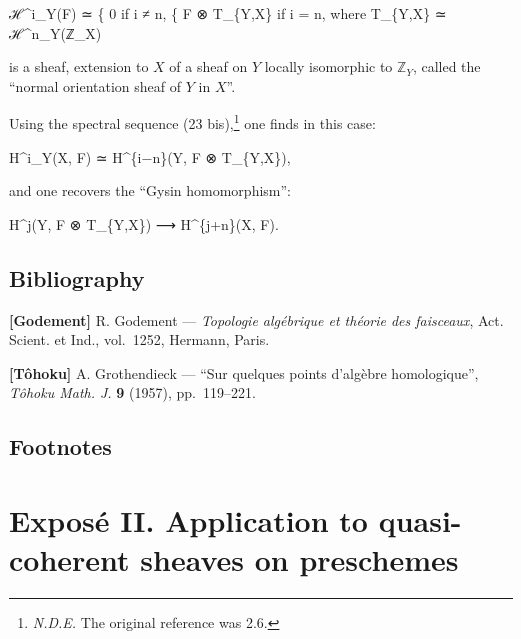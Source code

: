 \documentclass[
  11pt,
  a4paper,
]{book}
\newenvironment{Shaded}{}{}
\newcommand{\NormalTok}[1]{#1}
\begin{document}
\begin{Shaded}
\begin{Highlighting}[]
\NormalTok{ℋ\^{}i\_Y(F) ≃ \{ 0            if i ≠ n,}
\NormalTok{           \{ F ⊗ T\_\{Y,X\}   if i = n,    where  T\_\{Y,X\} ≃ ℋ\^{}n\_Y(ℤ\_X)}
\end{Highlighting}
\end{Shaded}

is a sheaf, extension to \(X\) of a sheaf on \(Y\) locally isomorphic to
\(\mathbb{Z}_{Y}\), called the ``normal orientation sheaf of \(Y\) in
\(X\)''.

Using the spectral sequence (23 bis),\footnote{\emph{N.D.E.} The
  original reference was 2.6.} one finds in this case:

\begin{Shaded}
\begin{Highlighting}[]
\NormalTok{H\^{}i\_Y(X, F) ≃ H\^{}\{i−n\}(Y, F ⊗ T\_\{Y,X\}),}
\end{Highlighting}
\end{Shaded}

and one recovers the ``Gysin homomorphism'':

\begin{Shaded}
\begin{Highlighting}[]
\NormalTok{H\^{}j(Y, F ⊗ T\_\{Y,X\}) ⟶ H\^{}\{j+n\}(X, F).}
\end{Highlighting}
\end{Shaded}

\section{Bibliography}\label{bibliography}

\textbf{{[}Godement{]}} R. Godement --- \emph{Topologie algébrique et
théorie des faisceaux}, Act. Scient. et Ind., vol.~1252, Hermann, Paris.

\textbf{{[}Tôhoku{]}} A. Grothendieck --- ``Sur quelques points
d'algèbre homologique'', \emph{Tôhoku Math. J.} \textbf{9} (1957),
pp.~119--221.

\section{Footnotes}\label{footnotes}

\chapter{Exposé II. Application to quasi-coherent sheaves on
preschemes}\label{exposuxe9-ii.-application-to-quasi-coherent-sheaves-on-preschemes}
\end{document}

